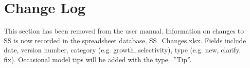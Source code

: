 \section{Change Log}

This section has been removed from the user manual.  Information on changes to SS is now recorded in the spreadsheet database, SS\_Changes.xlsx.  Fields include date, version number, category (e.g. growth, selectivity), type (e.g. new, clarify, fix).  Occasional model tips will be added with the type=”Tip”.